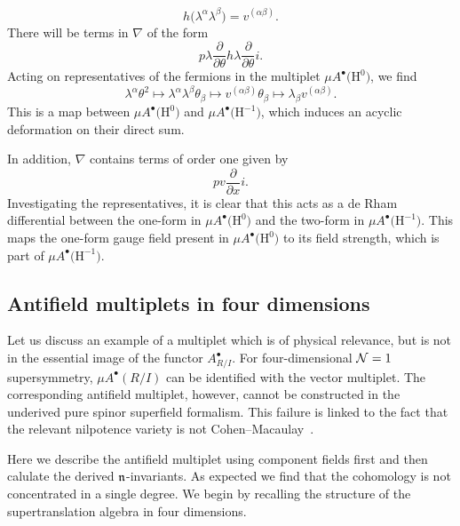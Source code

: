 \documentclass[pdftex]{sigma}
\numberwithin{equation}{section}
\def\bu{\bullet}
\begin{document}
\begin{eg}
\begin{equation*}
	h\big(\lambda^\alpha \lambda^\beta\big) = v^{(\alpha \beta)} .
	\end{equation*}
	There will be terms in $\nabla$ of the form
	\begin{equation*}
	p \lambda \frac{\partial}{\partial \theta} h \lambda \frac{\partial}{\partial \theta} i .
	\end{equation*}
	Acting on representatives of the fermions in the multiplet $\mu A^\bullet\big(\mathrm H^0\big)$, we find
	\begin{equation*}
	\lambda^\alpha \theta^2 \mapsto \lambda^\alpha \lambda^\beta \theta_\beta \mapsto v^{(\alpha \beta)} \theta_{\beta} \mapsto \lambda_{\beta} v^{(\alpha \beta)}.
	\end{equation*}
	This is a map between $\mu A^\bu\big(\mathrm H^0\big)$ and $\mu A^\bu\big(\mathrm H^{-1}\big)$, which induces an acyclic deformation on their direct sum.
	
	In addition, $\nabla$ contains terms of order one given by
	\begin{equation*}
	p v \frac{\partial}{\partial x} i .
	\end{equation*}
	Investigating the representatives, it is clear that this acts as a de Rham differential between the one-form in $\mu A^\bu\big(\mathrm H^0\big)$ and the two-form in $\mu A^\bu\big(\mathrm H^{-1}\big)$. This maps the one-form gauge field present in $\mu A^\bu\big(\mathrm H^0\big)$ to its field strength, which is part of $\mu A^\bu\big(\mathrm H^{-1}\big)$.
	
\end{eg}

\subsection{Antifield multiplets in four dimensions} \label{sec: vector anti}

Let us discuss an example of a multiplet which is of physical relevance, but is not in the essential image of the functor $A^\bullet_{R/I}$. For four-dimensional $\mathcal N=1$ supersymmetry, $\mu A^\bullet(R/I)$ can be identified with the vector multiplet. The corresponding antifield multiplet, however, cannot be constructed in the underived pure spinor superfield formalism. This failure is linked to the fact that the relevant nilpotence variety is not Cohen--Macaulay~\cite{perspectives}.

Here we describe the antifield multiplet using component fields first and then calulate the derived $\mathfrak n$-invariants. As expected we find that the cohomology is not concentrated in a single degree. We begin by recalling the structure of the supertranslation algebra in four dimensions.
\end{document}
